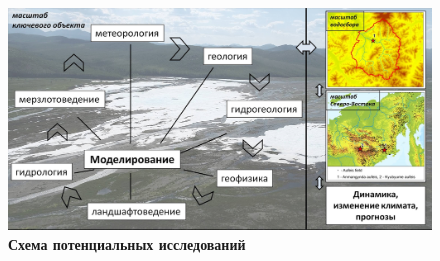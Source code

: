 \begin{figure}[h!]
  \begin{center}
    \includegraphics[width=1\textwidth]{authors/nesterova-2-fig-1.jpg}
  \end{center}
  \caption*{\textbf{Схема потенциальных исследований}}
  \label{fig:nesterova-1-fig-1}
\end{figure}
